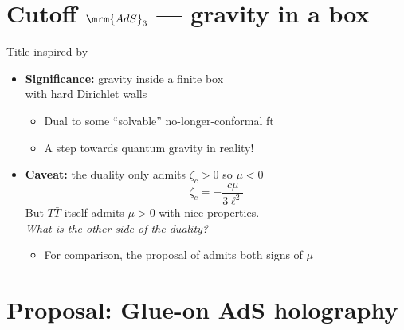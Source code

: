 \documentclass[10pt]{article}
\renewenvironment{frame}[1]%
	{\section*{#1}}%
	{\clearpage}
\newcommand{\pause}{}
\newenvironment{columns}%
	{\par\begin{minipage}{\textwidth}}%
	{\end{minipage}}
\newenvironment{column}[1]%
	{\begin{minipage}{#1}}%
	{\end{minipage}}
\newcommand{\TTbar}{\texorpdfstring{\ensuremath{T\bar{T}}}{TTbar}\xspace}
\begin{document}
\begin{frame}{Cutoff $\mrm{AdS}_3$ --- gravity in a box}{%
	Title inspired by
	\textcite{Kraus:2021cwf} -- %
}
\begin{columns}
\figCutoffAds
\hspace{-1.2em}
\begin{column}{.72\textwidth}
\vspace{-.5\baselineskip}
	\begin{itemize}
	\item \textbf{Significance:} gravity inside a finite box\\
		with hard Dirichlet walls
	
	\begin{itemize}
		\item Dual to some ``solvable'' no-longer-conformal ft
		\item A step towards quantum gravity in reality!
	\end{itemize}
	
\pause
	\item \textbf{Caveat:} the duality only admits $\zeta_c > 0$ so $\mu < 0$
	\begin{equation}
		\zeta_c = - \frac{c \mu}{3\ell^2}
	\end{equation}
	But \TTbar itself admits $\mu > 0$ with nice properties.\\
	\textit{What is the other side of the duality?}
		\begin{itemize}
		\item For comparison, the proposal of \textcite{Guica:2019nzm} admits both signs of $\mu$
		\end{itemize}
	\end{itemize}
\end{column}
\end{columns}
\end{frame}

\section{\textbf{Proposal:} Glue-on AdS holography} \label{se:glueonproposal}
\end{document}
